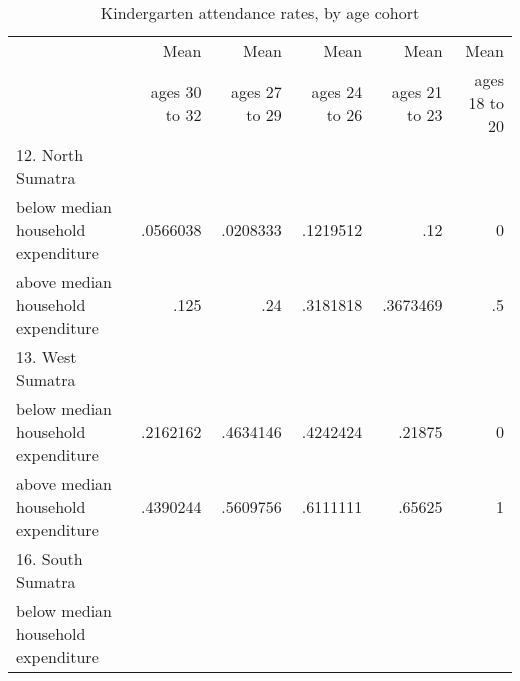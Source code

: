 \begin{table}[!h]
\caption{Kindergarten attendance rates, by age cohort}
\centering
\begin{tabular}{llllll}
\cline{1-6}
\multicolumn{1}{c}{} &
  \multicolumn{1}{|r}{Mean} &
  \multicolumn{1}{r}{Mean} &
  \multicolumn{1}{r}{Mean} &
  \multicolumn{1}{r}{Mean} &
  \multicolumn{1}{r}{Mean} \\
\multicolumn{1}{c}{} &
  \multicolumn{1}{|r}{ages 30 to 32} &
  \multicolumn{1}{r}{ages 27 to 29} &
  \multicolumn{1}{r}{ages 24 to 26} &
  \multicolumn{1}{r}{ages 21 to 23} &
  \multicolumn{1}{r}{ages 18 to 20} \\
\cline{1-6}
\multicolumn{1}{l}{12. North Sumatra} &
  \multicolumn{1}{|r}{} &
  \multicolumn{1}{r}{} &
  \multicolumn{1}{r}{} &
  \multicolumn{1}{r}{} &
  \multicolumn{1}{r}{} \\
\multicolumn{1}{l}{\hspace{1em}below median household expenditure} &
  \multicolumn{1}{|r}{.0566038} &
  \multicolumn{1}{r}{.0208333} &
  \multicolumn{1}{r}{.1219512} &
  \multicolumn{1}{r}{.12} &
  \multicolumn{1}{r}{0} \\
\multicolumn{1}{l}{\hspace{1em}above median household expenditure} &
  \multicolumn{1}{|r}{.125} &
  \multicolumn{1}{r}{.24} &
  \multicolumn{1}{r}{.3181818} &
  \multicolumn{1}{r}{.3673469} &
  \multicolumn{1}{r}{.5} \\
\multicolumn{1}{l}{13. West Sumatra} &
  \multicolumn{1}{|r}{} &
  \multicolumn{1}{r}{} &
  \multicolumn{1}{r}{} &
  \multicolumn{1}{r}{} &
  \multicolumn{1}{r}{} \\
\multicolumn{1}{l}{\hspace{1em}below median household expenditure} &
  \multicolumn{1}{|r}{.2162162} &
  \multicolumn{1}{r}{.4634146} &
  \multicolumn{1}{r}{.4242424} &
  \multicolumn{1}{r}{.21875} &
  \multicolumn{1}{r}{0} \\
\multicolumn{1}{l}{\hspace{1em}above median household expenditure} &
  \multicolumn{1}{|r}{.4390244} &
  \multicolumn{1}{r}{.5609756} &
  \multicolumn{1}{r}{.6111111} &
  \multicolumn{1}{r}{.65625} &
  \multicolumn{1}{r}{1} \\
\multicolumn{1}{l}{16. South Sumatra} &
  \multicolumn{1}{|r}{} &
  \multicolumn{1}{r}{} &
  \multicolumn{1}{r}{} &
  \multicolumn{1}{r}{} &
  \multicolumn{1}{r}{} \\
\multicolumn{1}{l}{\hspace{1em}below median household expenditure} &

\end{tabular}
\end{table}
